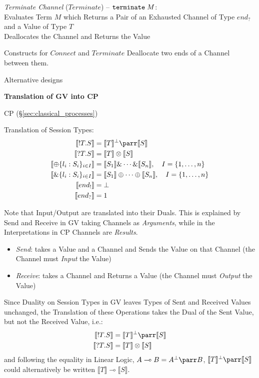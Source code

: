 \emph{Terminate Channel} ($Terminate$) -- $\mathtt{terminate}\; M$: \\
Evaluates Term $M$ which Returns a Pair of an Exhausted Channel of
Type $end_?$ and a Value of Type $T$ \\
Deallocates the Channel and Returns the Value

Constructs for $Connect$ and $Terminate$ Deallocate two ends of a
Channel between them.

Alternative designs %


\asterism


\textbf{Translation of GV into CP}

CP (\S\ref{sec:classical_processes})

Translation of Session Types:
\begin{align*}
  \llbracket !T.S \rrbracket &=
    \llbracket T \rrbracket^\bot \parr \llbracket S \rrbracket \\
  \llbracket ?T.S \rrbracket &=
    \llbracket T \rrbracket \otimes \llbracket S \rrbracket \\
  \llbracket \oplus \{l_i : S_i\}_{i \in I} \rrbracket &=
    \llbracket S_1 \rrbracket \& \cdots \& \llbracket S_n \rrbracket,
    \quad I = \{1,\ldots,n\} \\
  \llbracket \& \{l_i : S_i\}_{i \in I} \rrbracket &=
    \llbracket S_1 \rrbracket \oplus \cdots \oplus
    \llbracket S_n \rrbracket, \quad I = \{1,\ldots,n\} \\
  \llbracket end_! \rrbracket &= \bot \\
  \llbracket end_? \rrbracket &= 1
\end{align*}

\fist Note that Input/Output are translated into their Duals. This is
explained by Send and Receive in GV taking Channels as
\emph{Arguments}, while in the Interpretations in CP Channels are
\emph{Results}.
\begin{itemize}
  \item \emph{Send}: takes a Value and a Channel and Sends the Value
    on that Channel (the Channel must \emph{Input} the Value)
  \item \emph{Receive}: takes a Channel and Returns a Value (the
    Channel must \emph{Output} the Value)
\end{itemize}
Since Duality on Session Types in GV leaves Types of Sent and Received
Values unchanged, the Translation of these Operations takes the Dual
of the Sent Value, but not the Received Value, i.e.:
\begin{align*}
  \llbracket !T.S \rrbracket &=
    \llbracket T \rrbracket^\bot \parr \llbracket S \rrbracket \\
  \llbracket ?T.S \rrbracket &=
    \llbracket T \rrbracket \otimes \llbracket S \rrbracket
\end{align*}
and following the equality in Linear Logic, $A \multimap B = A^\bot
\parr B$, $\llbracket T \rrbracket^\bot \parr \llbracket S \rrbracket$
could alternatively be written $\llbracket T \rrbracket \multimap
\llbracket S \rrbracket$.

